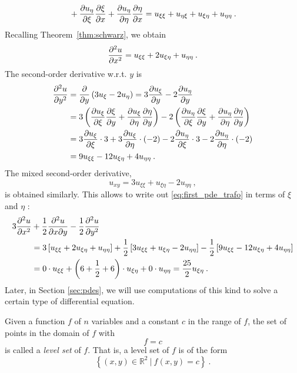\begin{example}
\begin{enumerate}[(i)]
\begin{equation*}
\begin{split}
		\: + \: \displaystyle{\frac{\partial u_{\eta}}{\partial \xi}} \displaystyle{\frac{\partial \xi}{\partial x}} + \displaystyle{\frac{\partial u_{\eta}}{\partial \eta}} \displaystyle{\frac{\partial \eta}{\partial x}} 
		 = u_{\xi\xi} + u_{\eta\xi} + u_{\xi\eta} + u_{\eta\eta} \:.
	\end{split}
	\end{equation*}
	Recalling Theorem~\ref{thm:schwarz}, we obtain
	\[ \displaystyle{\frac{\partial^2 u}{\partial x^2}} =  u_{\xi\xi} + 2 u_{\xi\eta} + u_{\eta\eta} \:. \]
	The second-order derivative w.r.t. $y$ is 
	\begin{equation*}
	\begin{split}
	\displaystyle{\frac{\partial^2 u}{\partial y^2}} &= \displaystyle{\frac{\partial }{\partial y}}\left( 3u_{\xi} - 2 u_{\eta} \right)
	= 3\displaystyle{\frac{\partial u_{\xi}}{\partial y}} -2 \displaystyle{\frac{\partial u_{\eta}}{\partial y}} \\
	&= 3 \left( \displaystyle{\frac{\partial u_{\xi}}{\partial \xi}} \displaystyle{\frac{\partial \xi}{\partial y}} + \displaystyle{\frac{\partial u_{\xi}}{\partial \eta}} \displaystyle{\frac{\partial \eta}{\partial y}} \right)
-2 \left( \displaystyle{\frac{\partial u_{\eta}}{\partial \xi}} \displaystyle{\frac{\partial \xi}{\partial y}} + \displaystyle{\frac{\partial u_{\eta}}{\partial \eta}} \displaystyle{\frac{\partial \eta}{\partial y}} \right) \\
	&= 3\displaystyle{\frac{\partial u_{\xi}}{\partial \xi}} \cdot 3 + 3\displaystyle{\frac{\partial u_{\xi}}{\partial \eta}} \cdot \left( -2 \right)
	-2 \displaystyle{\frac{\partial u_{\eta}}{\partial \xi}} \cdot 3
	-2 \displaystyle{\frac{\partial u_{\eta}}{\partial \eta}} \cdot \left( -2 \right) \\
	&= 9 u_{\xi\xi} -12 u_{\xi\eta} + 4 u_{\eta\eta} \:.
	\end{split}
	\end{equation*}
	The mixed second-order derivative,
	\[ u_{xy} = 3 u_{\xi\xi} + u_{\xi\eta} - 2 u_{\eta\eta} \:, \]
	is obtained similarly. 
	This allows to write out \eqref{eq:first_pde_trafo} in terms of $\xi$ and $\eta$ :
	\begin{equation*}
	\begin{split}
	3\displaystyle{\frac{\partial^2 u}{\partial x^2}} & +\frac12 \displaystyle{\frac{\partial^2 u}{\partial{x}\partial{y}}} -\frac12 \displaystyle{\frac{\partial^2 u}{\partial y^2}} \\
	&= 3 \left[ u_{\xi\xi} + 2 u_{\xi\eta} + u_{\eta\eta} \right] 
	+\frac12 \left[ 3 u_{\xi\xi} + u_{\xi\eta} - 2 u_{\eta\eta} \right] 
	-\frac12 \left[ 9 u_{\xi\xi} - 12 u_{\xi\eta} + 4 u_{\eta\eta} \right] \\
	&= 0 \cdot u_{\xi\xi} + \left( 6 + \frac12 + 6 \right) \cdot u_{\xi\eta}
	+ 0 \cdot u_{\eta\eta} = \frac{25}{2} u_{\xi\eta} \:.
	\end{split}
	\end{equation*}
	Later, in Section \ref{sec:pdes}, we will use computations of this kind to solve a certain type of differential equation.
\end{enumerate}
\end{example}

\begin{definition}
Given a function $f$ of $n$ variables and a constant $c$ in the range of $f$, the set of points in the domain of $f$ with
\[ f = c \]
is called a \emph{level set} of $f$. That is, a level set of $f$ is of the form
\[  \left\{ (x,y)\in\mathbb{R}^2 \: | \: f(x,y)=c \right\}\:.\]
\end{definition}

